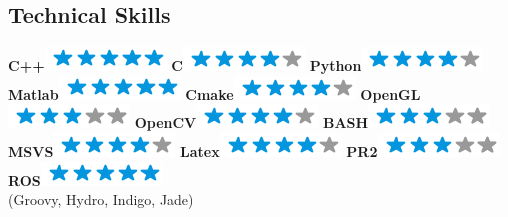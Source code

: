 \documentclass[]{friggeri-cv}
\begin{document}
\begin{aside}
  \section{Technical Skills}
    \textbf{C++}\includegraphics[scale=0.40]{img/5stars.png}
    \textbf{C}\includegraphics[scale=0.40]{img/4stars.png}
    \textbf{Python}\includegraphics[scale=0.40]{img/4stars.png}
    \textbf{Matlab}\includegraphics[scale=0.40]{img/5stars.png}
    \textbf{Cmake}\includegraphics[scale=0.40]{img/4stars.png}
    \textbf{OpenGL}\includegraphics[scale=0.40]{img/3stars.png}
    \textbf{OpenCV}\includegraphics[scale=0.40]{img/4stars.png}
    \textbf{BASH}\includegraphics[scale=0.40]{img/3stars.png}
    \textbf{MSVS}\includegraphics[scale=0.40]{img/4stars.png}
    \textbf{Latex}\includegraphics[scale=0.40]{img/4stars.png}
    \textbf{PR2}\includegraphics[scale=0.40]{img/3stars.png}
    \textbf{ROS}\includegraphics[scale=0.40]{img/5stars.png}\\ \scriptsize{(Groovy, Hydro, Indigo, Jade)}
    ~
\end{aside}
\end{document}
